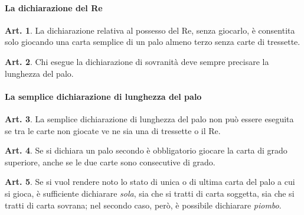 \documentclass[italian,a4paper]{book}
\theoremstyle{definition}
\newtheorem{art}{Art.}
\begin{document}
\paragraph{La dichiarazione del Re}
\begin{art}
    La dichiarazione relativa al possesso del Re, senza giocarlo, è consentita solo giocando una carta semplice di un palo almeno terzo senza carte di tressette.
\end{art}
\begin{art}
    Chi esegue la dichiarazione di sovranità deve sempre precisare la lunghezza del palo.
\end{art}
\paragraph{La semplice dichiarazione di lunghezza del palo}
\begin{art}
    La semplice dichiarazione di lunghezza del palo non può essere eseguita se tra le carte non giocate ve ne sia una di tressette o il Re.
\end{art}
\begin{art}
    Se si dichiara un palo secondo è obbligatorio giocare la carta di grado superiore, anche se le due carte sono consecutive di grado.
\end{art}
\begin{art}
    Se si vuol rendere noto lo stato di unica o di ultima carta del palo a cui si gioca, è sufficiente dichiarare \emph{sola}, sia che si tratti di carta soggetta, sia che si tratti di carta sovrana; nel secondo caso, però, è possibile dichiarare \emph{piombo}.
\end{art}
\end{document}

